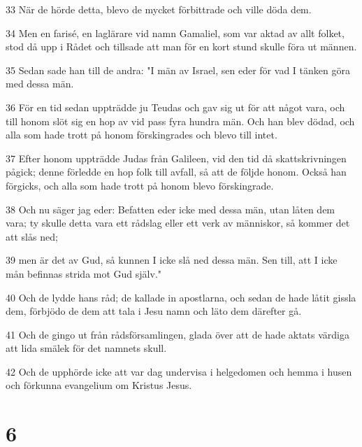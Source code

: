\par 33 När de hörde detta, blevo de mycket förbittrade och ville döda dem.
\par 34 Men en farisé, en laglärare vid namn Gamaliel, som var aktad av allt folket, stod då upp i Rådet och tillsade att man för en kort stund skulle föra ut männen.
\par 35 Sedan sade han till de andra: "I män av Israel, sen eder för vad I tänken göra med dessa män.
\par 36 För en tid sedan uppträdde ju Teudas och gav sig ut för att något vara, och till honom slöt sig en hop av vid pass fyra hundra män. Och han blev dödad, och alla som hade trott på honom förskingrades och blevo till intet.
\par 37 Efter honom uppträdde Judas från Galileen, vid den tid då skattskrivningen pågick; denne förledde en hop folk till avfall, så att de följde honom. Också han förgicks, och alla som hade trott på honom blevo förskingrade.
\par 38 Och nu säger jag eder: Befatten eder icke med dessa män, utan låten dem vara; ty skulle detta vara ett rådslag eller ett verk av människor, så kommer det att slås ned;
\par 39 men är det av Gud, så kunnen I icke slå ned dessa män. Sen till, att I icke mån befinnas strida mot Gud själv."
\par 40 Och de lydde hans råd; de kallade in apostlarna, och sedan de hade låtit gissla dem, förbjödo de dem att tala i Jesu namn och läto dem därefter gå.
\par 41 Och de gingo ut från rådsförsamlingen, glada över att de hade aktats värdiga att lida smälek för det namnets skull.
\par 42 Och de upphörde icke att var dag undervisa i helgedomen och hemma i husen och förkunna evangelium om Kristus Jesus.

\chapter{6}

